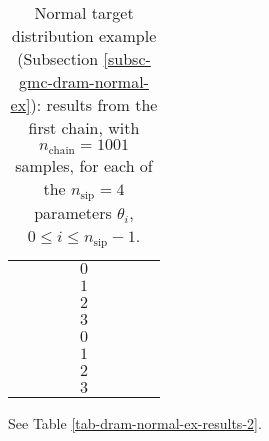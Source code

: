 \begin{table}[h!]
\begin{center}
\begin{tabular}{|c|c|c|c|c|c|c|c|c|}
\hline
\hline
       &          &                        &                        & $0$ &                          &                                &                        &                               \\
\cline{5-9}
       &          &                        &                        & $1$ &                          &                                &                        &                               \\
\cline{5-9}
       &          &                        &                        & $2$ &                          &                                &                        &                               \\
\cline{5-9}
       &          &                        &                        & $3$ &                          &                                &                        &                               \\
\hline
\hline
       &          &                        &                        & $0$ &                          &                                &                        &                               \\
\cline{5-9}
       &          &                        &                        & $1$ &                          &                                &                        &                               \\
\cline{5-9}
       &          &                        &                        & $2$ &                          &                                &                        &                               \\
\cline{5-9}
       &          &                        &                        & $3$ &                          &                                &                        &                               \\
\hline
\end{tabular}
\caption{Normal target distribution example (Subsection \ref{subsc-gmc-dram-normal-ex}):
results from the first chain, with $n_{\text{chain}}=1001$ samples,
for each of the $n_{\text{sip}}=4$ parameters $\theta_i$, $0\leqslant i\leqslant n_{\text{sip}}-1$.
}
\label{tab-dram-normal-ex-results-1}
\end{center}
\end{table}

See Table \ref{tab-dram-normal-ex-results-2}.

